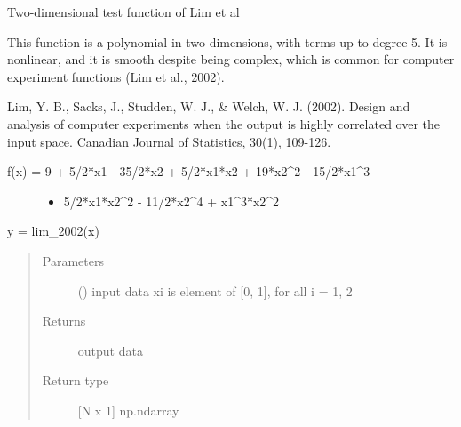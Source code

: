 \documentclass[letterpaper,10pt,english,openany,oneside]{sphinxmanual}
\begin{document}
\begin{fulllineitems}
\label{\detokenize{pygpc:pygpc.testfun.lim_2002}}
Two-dimensional test function of Lim et al

This function is a polynomial in two dimensions, with terms up to degree
5. It is nonlinear, and it is smooth despite being complex, which is
common for computer experiment functions (Lim et al., 2002).

Lim, Y. B., Sacks, J., Studden, W. J., \& Welch, W. J. (2002). Design
and analysis of computer experiments when the output is highly correlated
over the input space. Canadian Journal of Statistics, 30(1), 109-126.
\begin{description}
\item[{f(x) = 9 + 5/2*x1 - 35/2*x2 + 5/2*x1*x2 + 19*x2\textasciicircum{}2 - 15/2*x1\textasciicircum{}3}] \leavevmode\begin{itemize}
\item {} 
5/2*x1*x2\textasciicircum{}2 - 11/2*x2\textasciicircum{}4 + x1\textasciicircum{}3*x2\textasciicircum{}2

\end{itemize}

\end{description}

y = lim\_2002(x)
\begin{quote}\begin{description}
\item[{Parameters}] \leavevmode
{} (\sphinxstyleliteralemphasis{\sphinxupquote{{[}}}\sphinxstyleliteralemphasis{\sphinxupquote{{]} }}) \textendash{} input data
xi is element of {[}0, 1{]}, for all i = 1, 2

\item[{Returns}] \leavevmode
{} \textendash{} output data

\item[{Return type}] \leavevmode
{[}N x 1{]} np.ndarray

\end{description}\end{quote}

\end{fulllineitems}

\end{document}
